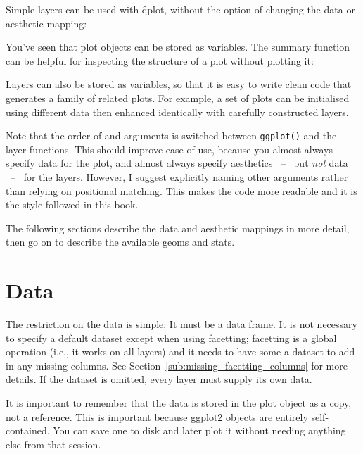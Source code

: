 Simple layers can be used with \f{qplot}, without the option of changing the data or aesthetic mapping:

% 


You've seen that plot objects can be stored as variables. The summary function can be helpful for inspecting the structure of a plot without plotting it:

%
%


Layers can also be stored as variables, so that it is easy to write clean code that generates a family of related plots.  For example, a set of plots can be initialised using different data then enhanced identically with carefully constructed layers.

Note that the order of  and  arguments is switched between {\tt ggplot()} and the layer functions.  This should improve ease of use, because you almost always specify data for the plot, and almost always specify aesthetics ~--~ but {\em not} data ~--~ for the layers.  However, I suggest explicitly naming other arguments rather than relying on positional matching.  This makes the code more readable and it is the style followed in this book.

The following sections describe the data and aesthetic mappings in more detail, then go on to describe the available geoms and stats.

\section{Data}
\label{sec:data}

The restriction on the data is simple: It must be a data frame.  It is not necessary to specify a default dataset except when using facetting; facetting is a global operation (i.e., it works on all layers) and it needs to have some a dataset to add in any missing columns.  See Section~\ref{sub:missing_facetting_columns} for more details.  If the dataset is omitted, every layer must supply its own data.

It is important to remember that the data is stored in the plot object as a copy, not a reference.  This is important because ggplot2 objects are entirely self-contained.  You can save one to disk and later plot it without needing anything else from that session.


